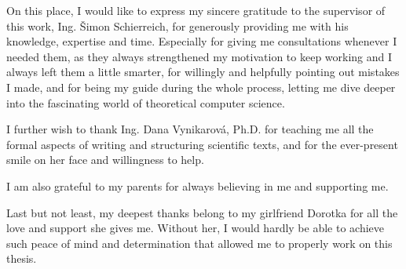 \documentclass[english,bachelor,unicode]{ctufit-thesis}
\theoremstyle{plain}
\theoremstyle{definition}
\theoremstyle{remark}
\numberwithin{theorem}{chapter}
\begin{document}
 
\frontmatter\frontmatterinit %


\thispagestyle{empty}\cleardoublepage\maketitle %

\imprintpage %

\tableofcontents %


\listoffigures %
\begingroup
\let\clearpage\relax
\endgroup


\begin{acknowledgmentpage}
    On this place, I would like to express my sincere gratitude to the supervisor of this work, Ing. Šimon Schierreich,
    for generously providing me with his knowledge, expertise and time.
    Especially for giving me consultations whenever I needed them, as
    they always strengthened my motivation to keep working and I always left them a little smarter,
    for willingly and helpfully pointing out mistakes I made, and
    for being my guide during the whole process, letting me dive deeper into the fascinating world of
    theoretical computer science.

    I further wish to thank Ing. Dana Vynikarová, Ph.D. for teaching me all the formal aspects of writing
    and structuring scientific texts, and for the ever-present smile on her face
    and willingness to help.

    I am also grateful to my parents for always believing in me and supporting me.

    Last but not least, my deepest thanks belong to my girlfriend Dorotka for all the love and support she gives me.
    Without her, I would hardly be able to achieve such peace of mind and determination that
    allowed me to properly work on this thesis.
\end{acknowledgmentpage} 
\end{document}
